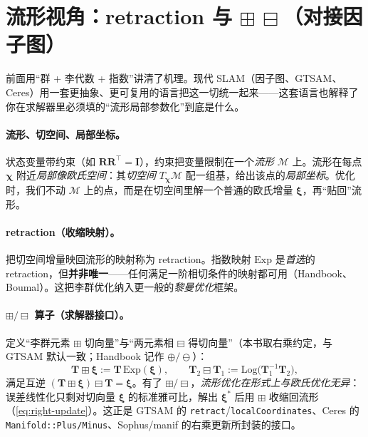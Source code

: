 \section{流形视角：retraction 与 \texorpdfstring{$\boxplus\,\boxminus$}{boxplus/boxminus}（对接因子图）}
\label{sec:manifold}

前面用“群 + 李代数 + 指数”讲清了机理。现代 SLAM（因子图、GTSAM、Ceres）用一套更抽象、更可复用的语言把这一切统一起来——这套语言也解释了你在求解器里必须填的“流形局部参数化”到底是什么\cite{carlone2026handbook,hertzberg2013integrating}。

\paragraph{流形、切空间、局部坐标。}状态变量带约束（如 $\mathbf{R}\mathbf{R}^\top=\mathbf{I}$），约束把变量限制在一个\emph{流形} $\mathcal{M}$ 上。流形在每点 $\boldsymbol{\chi}$ 附近\emph{局部像欧氏空间}：其\emph{切空间} $T_{\boldsymbol{\chi}}\mathcal{M}$ 配一组基，给出该点的\emph{局部坐标}。优化时，我们不动 $\mathcal{M}$ 上的点，而是在切空间里解一个普通的欧氏增量 $\boldsymbol{\xi}$，再“贴回”流形。

\paragraph{retraction（收缩映射）。}把切空间增量映回流形的映射称为 retraction。指数映射 $\mathrm{Exp}$ 是\emph{首选}的 retraction，但\textbf{并非唯一}——任何满足一阶相切条件的映射都可用（Handbook、Boumal）。这把李群优化纳入更一般的\emph{黎曼优化}框架。

\paragraph{$\boxplus/\boxminus$ 算子（求解器接口）。}定义“李群元素 $\boxplus$ 切向量”与“两元素相 $\boxminus$ 得切向量”（本书取右乘约定，与 GTSAM 默认一致；Handbook 记作 $\oplus/\ominus$）：
\begin{equation}
  \mathbf{T}\boxplus\boldsymbol{\xi}:=\mathbf{T}\,\mathrm{Exp}(\boldsymbol{\xi}),\qquad
  \mathbf{T}_2\boxminus\mathbf{T}_1:=\mathrm{Log}\big(\mathbf{T}_1^{-1}\mathbf{T}_2\big),
  \label{eq:boxplus}
\end{equation}
满足互逆 $(\mathbf{T}\boxplus\boldsymbol{\xi})\boxminus\mathbf{T}=\boldsymbol{\xi}$。有了 $\boxplus/\boxminus$，\emph{流形优化在形式上与欧氏优化无异}：误差线性化只剩对切向量 $\boldsymbol{\xi}$ 的标准雅可比，解出 $\boldsymbol{\xi}^*$ 后用 $\boxplus$ 收缩回流形（\cref{eq:right-update}）。这正是 GTSAM 的 \texttt{retract}/\texttt{localCoordinates}、Ceres 的 \texttt{Manifold::Plus/Minus}、Sophus/manif 的右乘更新所封装的接口。

